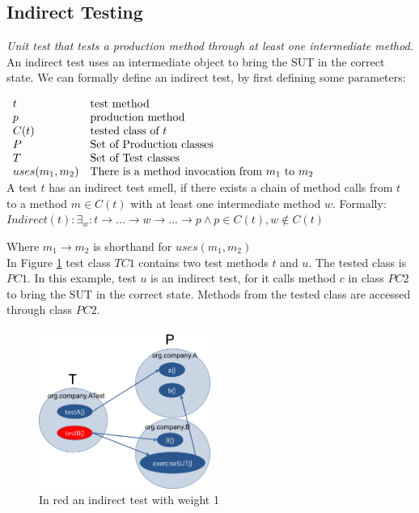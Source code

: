 
\subsection{Indirect Testing}
\emph{Unit test that tests a production method through at least one intermediate method.}\\

An indirect test uses an intermediate object to bring the SUT in the correct state. We can formally define an indirect test, by first defining some parameters:

$\begin{array}{ll}
t &  \hbox{test method} \\
p &  \hbox{production method} \\
C(t) & \hbox{tested class of } t \\
P  & \hbox{Set of Production classes} \\
T & \hbox{Set of Test classes} \\
uses(m_1,m_2) & \hbox{There is a method invocation from $m_1$ to $m_2$} \\
\end{array}$ \\

A test $t$ has an indirect test smell, if there exists a chain of method calls from $t$ to a method $m \in C(t)$ with at least one intermediate method $w$. Formally: \\

\begin{math} 
Indirect(t) : \exists_w : t \rightarrow ... \rightarrow w \rightarrow ... \rightarrow p \wedge p \in C(t), w \notin C(t) 
\end{math}

Where $ m_1 \rightarrow m_2$ is shorthand for $uses(m_1, m_2)$ \\

In Figure \ref{fig:IndirectTest} test class $TC1$ contains two test methods $t$ and $u$. The tested class is $PC1$. In this example, test $u$ is an indirect test, for it calls method $c$ in class $PC2$ to bring the SUT in the correct state. Methods from the tested class are accessed through class $PC2$. 

\begin{figure}[!ht]
	
	\centering
	\includegraphics[width=0.5\textwidth]{figures/IndirectTest.png}
	\caption{In red an indirect test with weight 1}
	\label{fig:IndirectTest}
\end{figure}


